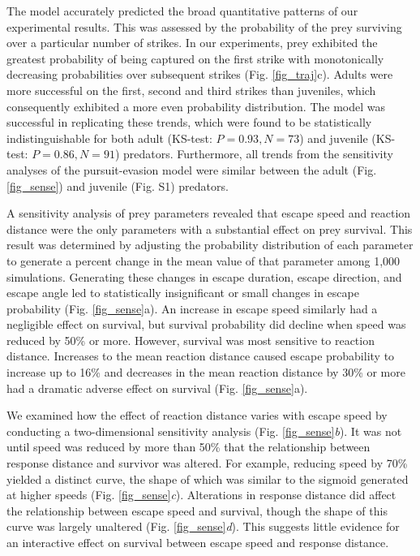 \documentclass[]{rsos}%
\begin{document}
The model accurately predicted the broad quantitative patterns of our experimental results.
This was assessed by the probability of the prey surviving over a particular number of strikes. 
In our experiments, prey exhibited the greatest probability of being captured on the first strike with monotonically decreasing probabilities over subsequent strikes (Fig. \ref{fig_traj}c).
Adults were more successful on the first, second and third strikes than juveniles, which consequently exhibited a more even probability distribution.
The model was successful in replicating these trends, which were found to be statistically indistinguishable for both adult (KS-test: $P = 0.93, N = 73$) and juvenile (KS-test: $P = 0.86, N = 91$) predators. 
Furthermore, all trends from the sensitivity analyses of the pursuit-evasion model were similar between the adult (Fig. \ref{fig_sense}) and juvenile (Fig. S1) predators. 

A sensitivity analysis of prey parameters revealed that escape speed and reaction distance were the only parameters with a substantial effect on prey survival. 
This result was determined by adjusting the probability distribution of each parameter to generate a percent change in the mean value of that parameter among 1,000 simulations.
Generating these changes in escape duration, escape direction, and escape angle led to statistically insignificant or small changes in escape probability (Fig. \ref{fig_sense}a). 
An increase in escape speed similarly had a negligible effect on survival, but survival probability did decline when speed was reduced by 50\% or more.
However, survival was most sensitive to reaction distance.
Increases to the mean reaction distance caused escape probability to increase up to 16\% and decreases in the mean reaction distance by 30\% or more had a dramatic adverse effect on survival (Fig. \ref{fig_sense}a). 

We examined how the effect of reaction distance varies with escape speed by conducting a two-dimensional sensitivity analysis (Fig. \ref{fig_sense}\textit{b}).
It was not until speed was reduced by more than 50\% that the relationship between response distance and survivor was altered.
For example, reducing speed by 70\% yielded a distinct curve, the shape of which was similar to the sigmoid generated at higher speeds (Fig. \ref{fig_sense}\textit{c}). 
Alterations in response distance did affect the relationship between escape speed and survival, though the shape of this curve was largely unaltered (Fig. \ref{fig_sense}\textit{d}).
This suggests little evidence for an interactive effect on survival between escape speed and response distance.
\end{document}
